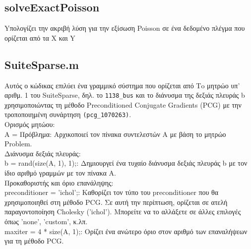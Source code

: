 \documentclass[12pt,a4paper]{article}
\begin{document}
\subsection{solveExactPoisson}
Yπολογίζει την ακριβή λύση για την εξίσωση Poisson σε ένα δεδομένο πλέγμα που ορίζεται από τα X και Y
\subsection{SuiteSparse.m}
Αυτός ο κώδικας επιλύει ένα γραμμικό σύστημα που ορίζεται από Τo μητρώο υπ’ αριθμ. 1 του SuiteSparse, δηλ. το \texttt{1138\_bus} και το διάνυσμα της δεξιάς πλευράς b χρησιμοποιώντας τη μέθοδο Preconditioned Conjugate Gradients (PCG) με την τροποποιημένη συνάρτηση \texttt{(pcg\_1070263)}. \\
Ορισμός μητώου:\\
A = Πρόβλημα: Αρχικοποιεί τον πίνακα συντελεστών A με βάση το μητρώο Problem. \\

Διάνυσμα δεξιάς πλευράς:\\
b = rand(size(A, 1), 1);: Δημιουργεί ένα τυχαίο διάνυσμα δεξιάς πλευράς b με τον ίδιο αριθμό γραμμών με τον πίνακα A.\\

Προκαθοριστής και όριο επανάληψης:\\
preconditioner = 'ichol';: Καθορίζει τον τύπο του preconditioner που θα χρησιμοποιηθεί στη μέθοδο PCG. Σε αυτή την περίπτωση, ορίζεται σε ατελή παραγοντοποίηση Cholesky ('ichol'). Μπορείτε να το αλλάξετε σε άλλες επιλογές όπως 'none', 'custom', κ.λπ. \\
maxiter = 4 * size(A, 1);: Ορίζει ένα ανώτερο όριο στον αριθμό των επαναλήψεων για τη μέθοδο PCG.\\
\end{document}
